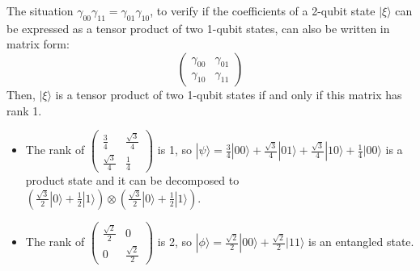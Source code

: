 \begin{example}
   The situation $\gamma_{00} \gamma_{11}=\gamma_{01} \gamma_{10}$, to verify if the coefficients of a 2-qubit state $|\xi\rangle$ can be expressed as a tensor product of two 1-qubit states, can also be written in matrix form:
	$$
	\left(\begin{array}{ll}
		\gamma_{00} & \gamma_{01} \\
		\gamma_{10} & \gamma_{11}
	\end{array}\right)
	$$
	Then, $|\xi\rangle$ is a tensor product of two 1-qubit states if and only if this matrix has rank 1.

    \begin{itemize}
        \item The rank of $\left(\begin{array}{cc}\frac{3}{4} & \frac{\sqrt{3}}{4} \\ \frac{\sqrt{3}}{4} & \frac{1}{4}\end{array}\right)$ is 1, so $|\psi\rangle =\frac{3}{4}|00\rangle+\frac{\sqrt{3}}{4}|01\rangle+\frac{\sqrt{3}}{4}|10\rangle+\frac{1}{4}|00\rangle$ is a product state and it can be decomposed to $\left(\frac{\sqrt{3}}{2}|0\rangle+\frac{1}{2}|1\rangle\right)\otimes\left(\frac{\sqrt{3}}{2}|0\rangle+\frac{1}{2}|1\rangle\right)$.
        \item The rank of $\left(\begin{array}{cc}\frac{\sqrt{2}}{2} & 0 \\ 0 & \frac{\sqrt{2}}{2}\end{array}\right)$ is 2, so $|\phi\rangle=\frac{\sqrt{2}}{2}|00\rangle+\frac{\sqrt{2}}{2}|11\rangle$ is an entangled state.
    \end{itemize}
\end{example}